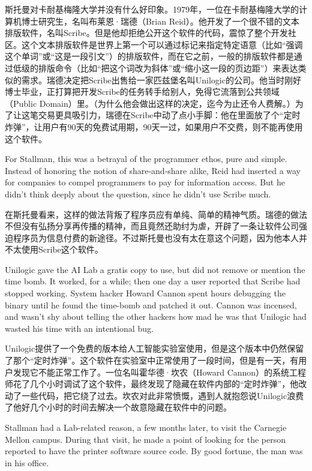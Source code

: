 \ifdefined\chs
斯托曼对卡耐基梅隆大学并没有什么好印象。1979年，一位在卡耐基梅隆大学的计算机博士研究生，名叫布莱恩·瑞德（Brian Reid）。他开发了一个很不错的文本排版软件，名叫Scribe。但是他却拒绝公开这个软件的代码，震惊了整个开发社区。这个文本排版软件是世界上第一个可以通过标记来指定特定语意（比如``强调这个单词''或``这是一段引文''）的排版软件，而在它之前，一般的排版软件都是通过低级的排版命令（比如``把这个词改为斜体''或``缩小这一段的页边距''）来表达类似的需求。瑞德决定把Scribe出售给一家匹兹堡名叫Unilogic的公司。他当时刚好博士毕业，正打算把开发Scribe的任务转手给别人，免得它流落到公共领域（Public Domain）里。（为什么他会做出这样的决定，迄今为止还令人费解。）为了让这笔交易更具吸引力，瑞德在Scribe中动了点小手脚：他在里面放了个``定时炸弹''，让用户有90天的免费试用期，90天一过，如果用户不交费，则不能再使用这个软件。
\fi

\ifdefined\eng
For Stallman, this was a betrayal of the programmer ethos, pure and simple. Instead of honoring the notion of share-and-share alike, Reid had inserted a way for companies to compel programmers to pay for information access. But he didn't think deeply about the question, since he didn't use Scribe much.
\fi

\ifdefined\chs
在斯托曼看来，这样的做法背叛了程序员应有单纯、简单的精神气质。瑞德的做法不但没有弘扬分享再传播的精神，而且竟然还助纣为虐，开辟了一条让软件公司强迫程序员为信息付费的新途径。不过斯托曼也没有太在意这个问题，因为他本人并不太使用Scribe这个软件。
\fi

\ifdefined\eng
Unilogic gave the AI Lab a gratis copy to use, but did not remove or mention the time bomb. It worked, for a while; then one day a user reported that Scribe had stopped working. System hacker Howard Cannon spent hours debugging the binary until he found the time-bomb and patched it out. Cannon was incensed, and wasn't shy about telling the other hackers how mad he was that Unilogic had wasted his time with an intentional bug.
\fi

\ifdefined\chs
Unilogic提供了一个免费的版本给人工智能实验室使用，但是这个版本中仍然保留了那个``定时炸弹''。这个软件在实验室中正常使用了一段时间，但是有一天，有用户发现它不能正常工作了。一位名叫霍华德·坎农（Howard Cannon）的系统工程师花了几个小时调试了这个软件，最终发现了隐藏在软件内部的``定时炸弹''，他改动了一些代码，把它绕了过去。坎农对此非常愤慨，遇到人就抱怨说Unilogic浪费了他好几个小时的时间去解决一个故意隐藏在软件中的问题。
\fi

\ifdefined\eng
Stallman had a Lab-related reason, a few months later, to visit the Carnegie Mellon campus. During that visit, he made a point of looking for the person reported to have the printer software source code. By good fortune, the man was in his office.
\fi

